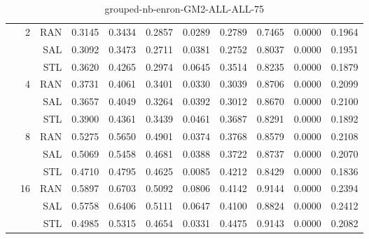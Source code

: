 \begin{center}
\begin{table}[htbp]
\begin{tabular}{ | r | r | r | r | r | r | r | r | r | r | r |}
 & \multirow{3}{*}{2} & RAN & 0.3145 & 0.3434 & 0.2857 & 0.0289 & 0.2789 & 0.7465 & 0.0000 & 0.1964\\ \cline{3-11}
 &   & SAL & 0.3092 & 0.3473 & 0.2711 & 0.0381 & 0.2752 & 0.8037 & 0.0000 & 0.1951\\ \cline{3-11}
 &   & STL & 0.3620 & 0.4265 & 0.2974 & 0.0645 & 0.3514 & 0.8235 & 0.0000 & 0.1879\\ \cline{2-11}
 & \multirow{3}{*}{4} & RAN & 0.3731 & 0.4061 & 0.3401 & 0.0330 & 0.3039 & 0.8706 & 0.0000 & 0.2099\\ \cline{3-11}
 &   & SAL & 0.3657 & 0.4049 & 0.3264 & 0.0392 & 0.3012 & 0.8670 & 0.0000 & 0.2100\\ \cline{3-11}
 &   & STL & 0.3900 & 0.4361 & 0.3439 & 0.0461 & 0.3687 & 0.8291 & 0.0000 & 0.1892\\ \cline{2-11}
 & \multirow{3}{*}{8} & RAN & 0.5275 & 0.5650 & 0.4901 & 0.0374 & 0.3768 & 0.8579 & 0.0000 & 0.2108\\ \cline{3-11}
 &   & SAL & 0.5069 & 0.5458 & 0.4681 & 0.0388 & 0.3722 & 0.8737 & 0.0000 & 0.2070\\ \cline{3-11}
 &   & STL & 0.4710 & 0.4795 & 0.4625 & 0.0085 & 0.4212 & 0.8429 & 0.0000 & 0.1836\\ \cline{2-11}
 & \multirow{3}{*}{16} & RAN & 0.5897 & 0.6703 & 0.5092 & 0.0806 & 0.4142 & 0.9144 & 0.0000 & 0.2394\\ \cline{3-11}
 &   & SAL & 0.5758 & 0.6406 & 0.5111 & 0.0647 & 0.4100 & 0.8824 & 0.0000 & 0.2412\\ \cline{3-11}
 &   & STL & 0.4985 & 0.5315 & 0.4654 & 0.0331 & 0.4475 & 0.9143 & 0.0000 & 0.2082\\ \cline{2-11}
\hline
\end{tabular}
\caption{grouped-nb-enron-GM2-ALL-ALL-75}
\end{table}
\end{center}


